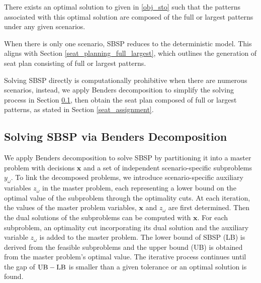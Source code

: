 \begin{prop}\label{prop_solution}
There exists an optimal solution to  given in \eqref{obj_sto} such that the patterns associated with this optimal solution are composed of the full or largest patterns under any given scenarios.
\end{prop}

When there is only one scenario, SBSP reduces to the deterministic model. This aligns with Section \ref{seat_planning_full_largest}, which outlines the generation of seat plan consisting of full or largest patterns.


Solving SBSP directly is computationally prohibitive when there are numerous scenarios, instead, we apply Benders decomposition to simplify the solving process in Section \ref{solve_by_benders}, then obtain the seat plan composed of full or largest patterns, as stated in Section \ref{seat_assignment}.

\subsection{Solving SBSP via Benders Decomposition}\label{solve_by_benders}
We apply Benders decomposition \citep{bnnobrs1962partitioning} to solve SBSP by partitioning it into a master problem with decisions $\mathbf{x}$ and a set of independent scenario-specific subproblems $y_{\omega}$. To link the decomposed problems, we introduce scenario-specific auxiliary variables $z_{\omega}$ in the master problem, each representing a lower bound on the optimal value of the subproblem through the optimality cuts. At each iteration, the values of the master problem variables, $\mathbf{x}$ and $z_{\omega}$ are first determined. Then the dual solutions of the subproblems can be computed with $\mathbf{x}$. For each subproblem, an optimality cut incorporating its dual solution and the auxiliary variable $z_{\omega}$ is added to the master problem. The lower bound of SBSP (LB) is derived from the feasible subproblems and the upper bound (UB) is obtained from the master problem's optimal value. The iterative process continues until the gap of $\textup{UB} - \textup{LB}$ is smaller than a given tolerance or an optimal solution is found.




